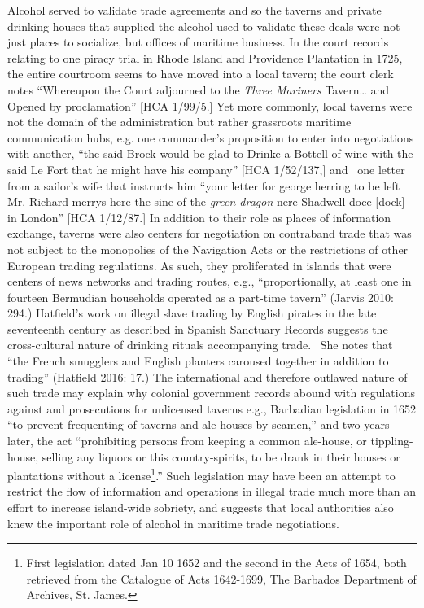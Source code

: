 \begin{styleStandard}
Alcohol served to validate trade agreements and so the taverns and private drinking houses that supplied the alcohol used to validate these deals were not just places to socialize, but offices of maritime business. In the court records relating to one piracy trial in Rhode Island and Providence Plantation in 1725, the entire courtroom seems to have moved into a local tavern; the court clerk notes “Whereupon the Court adjourned to the \textit{Three Mariners} Tavern… and Opened by proclamation” [HCA 1/99/5.] Yet more commonly, local taverns were not the domain of the administration but rather grassroots maritime communication hubs, e.g. one commander’s proposition to enter into negotiations with another, “the said Brock would be glad to Drinke a Bottell of wine with the said Le Fort that he might have his company” [HCA 1/52/137,] and \ one letter from a sailor’s wife that instructs him “your letter for george herring to be left Mr. Richard merrys here the sine of the \textit{green dragon} nere Shadwell doce [dock] in London” [HCA 1/12/87.] In addition to their role as places of information exchange, taverns were also centers for negotiation on contraband trade that was not subject to the monopolies of the Navigation Acts or the restrictions of other European trading regulations. As such, they proliferated in islands that were centers of news networks and trading routes, e.g., “proportionally, at least one in fourteen Bermudian households operated as a part-time tavern” (Jarvis 2010: 294.) Hatfield’s work on illegal slave trading by English pirates in the late seventeenth century as described in Spanish Sanctuary Records suggests the cross-cultural nature of drinking rituals accompanying trade. \ She notes that “the French smugglers and English planters caroused together in addition to trading” (Hatfield 2016: 17.) The international and therefore outlawed nature of such trade may explain why colonial government records abound with regulations against and prosecutions for unlicensed taverns e.g., Barbadian legislation in 1652 “to prevent frequenting of taverns and ale-houses by seamen,” and two years later, the act “prohibiting persons from keeping a common ale-house, or tippling-house, selling any liquors or this country-spirits, to be drank in their houses or plantations without a license\footnote{ First legislation dated Jan 10 1652 and the second in the Acts of 1654, both retrieved from the Catalogue of Acts 1642-1699, The Barbados Department of Archives, St. James.}.” Such legislation may have been an attempt to restrict the flow of information and operations in illegal trade much more than an effort to increase island-wide sobriety, and suggests that local authorities also knew the important role of alcohol in maritime trade negotiations. 
\end{styleStandard}

